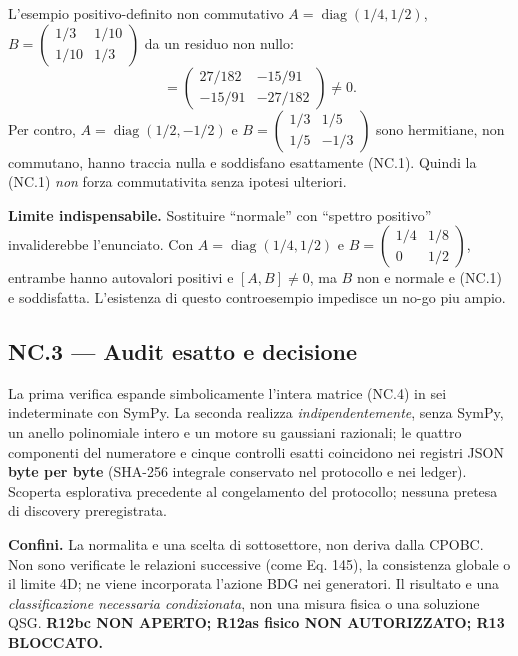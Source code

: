 \documentclass[11pt,a4paper]{article}
\begin{document}
L'esempio positivo-definito non commutativo $A=\operatorname{diag}(1/4,1/2)$, $B=\left(\begin{smallmatrix}1/3&1/10\\1/10&1/3\end{smallmatrix}\right)$ da un residuo non nullo:
\begin{equation}
[AB^{-1},A^{-1}B]=
\begin{pmatrix}27/182&-15/91\\-15/91&-27/182\end{pmatrix}\ne0.\tag{NC.5}
\end{equation}
Per contro, $A=\operatorname{diag}(1/2,-1/2)$ e $B=\left(\begin{smallmatrix}1/3&1/5\\1/5&-1/3\end{smallmatrix}\right)$ sono hermitiane, non commutano, hanno traccia nulla e soddisfano esattamente (NC.1). Quindi la (NC.1) \emph{non} forza commutativita senza ipotesi ulteriori.

\textbf{Limite indispensabile.} Sostituire ``normale'' con ``spettro positivo'' invaliderebbe l'enunciato. Con $A=\operatorname{diag}(1/4,1/2)$ e $B=\left(\begin{smallmatrix}1/4&1/8\\0&1/2\end{smallmatrix}\right)$, entrambe hanno autovalori positivi e $[A,B]\ne0$, ma $B$ non e normale e (NC.1) e soddisfatta. L'esistenza di questo controesempio impedisce un no-go piu ampio.

\subsection*{NC.3 --- Audit esatto e decisione}
La prima verifica espande simbolicamente l'intera matrice (NC.4) in sei indeterminate con SymPy. La seconda realizza \emph{indipendentemente}, senza SymPy, un anello polinomiale intero e un motore su gaussiani razionali; le quattro componenti del numeratore e cinque controlli esatti coincidono nei registri JSON \textbf{byte per byte} (SHA-256 integrale conservato nel protocollo e nei ledger). Scoperta esplorativa precedente al congelamento del protocollo; nessuna pretesa di discovery preregistrata.

\textbf{Confini.} La normalita e una scelta di sottosettore, non deriva dalla CPOBC. Non sono verificate le relazioni successive (come Eq. 145), la consistenza globale o il limite 4D; ne viene incorporata l'azione BDG nei generatori. Il risultato e una \emph{classificazione necessaria condizionata}, non una misura fisica o una soluzione QSG. \textbf{R12bc NON APERTO; R12as fisico NON AUTORIZZATO; R13 BLOCCATO.}
\end{document}

